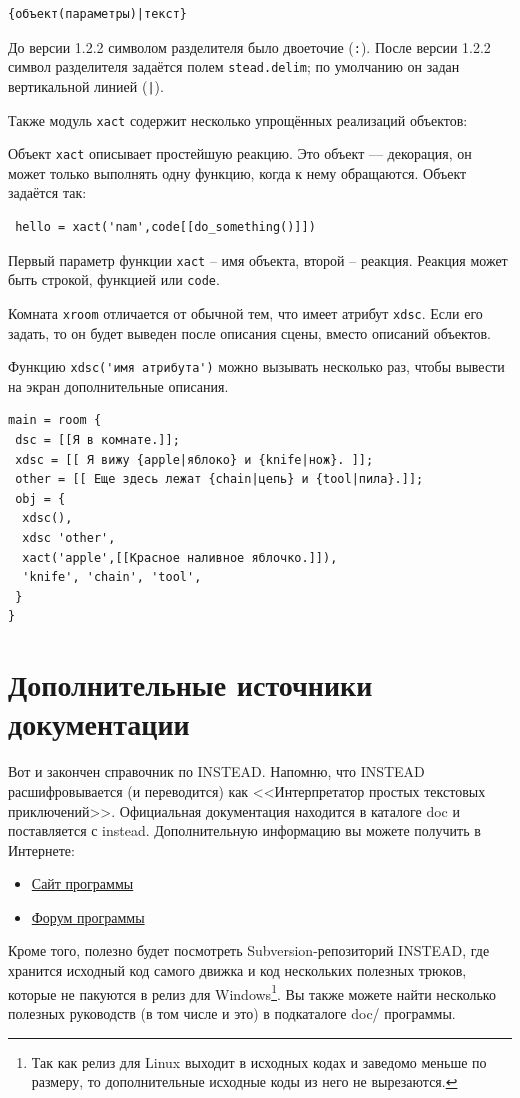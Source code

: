 \documentclass[12pt]{article}
\begin{document}
\begin{verbatim}
{объект(параметры)|текст}
\end{verbatim}

До версии 1.2.2 символом разделителя было двоеточие (\verb/:/). После версии 1.2.2 символ разделителя задаётся полем \verb/stead.delim/; по умолчанию он задан вертикальной линией (\verb/|/).

Также модуль \verb/xact/ содержит несколько упрощённых реализаций объектов:

Объект \verb/xact/ описывает простейшую реакцию. Это объект — декорация, он может только выполнять одну функцию, когда к нему обращаются. Объект задаётся так:

\begin{verbatim}
 hello = xact('nam',code[[do_something()]])
\end{verbatim}

Первый параметр функции \verb/xact/ – имя объекта, второй – реакция. Реакция может быть строкой, функцией или \verb/code/.

Комната \verb/xroom/ отличается от обычной тем, что имеет атрибут \verb/xdsc/. Если его задать, то он будет выведен после описания сцены, вместо описаний объектов.

Функцию \verb/xdsc('имя атрибута')/ можно вызывать несколько раз, чтобы вывести на экран дополнительные описания.

\begin{verbatim}
main = room {
 dsc = [[Я в комнате.]];
 xdsc = [[ Я вижу {apple|яблоко} и {knife|нож}. ]];
 other = [[ Еще здесь лежат {chain|цепь} и {tool|пила}.]];
 obj = {
  xdsc(),
  xdsc 'other',
  xact('apple',[[Красное наливное яблочко.]]),
  'knife', 'chain', 'tool',
 }
}
\end{verbatim}

\section{Дополнительные источники документации}
Вот и закончен справочник по INSTEAD. Напомню, что INSTEAD расшифровывается (и переводится) как <<Интерпретатор простых текстовых приключений>>. Официальная документация находится в каталоге doc и поставляется с instead. Дополнительную информацию вы можете получить в Интернете:

\begin{itemize}
\item \href{http://instead.googlecode.com/}{Сайт программы}
\item \href{http://instead.pinebrush.com/}{Форум программы}
\end{itemize}

Кроме того, полезно будет посмотреть Subversion-репозиторий INSTEAD, где хранится исходный код самого движка и код нескольких полезных трюков, которые не пакуются в релиз для Windows\footnote{Так как релиз для Linux выходит в исходных кодах и заведомо меньше по размеру, то дополнительные исходные коды из него не вырезаются.}. Вы также можете найти несколько полезных руководств (в том числе и это) в подкаталоге doc/ программы.

\printindex
\end{document}

